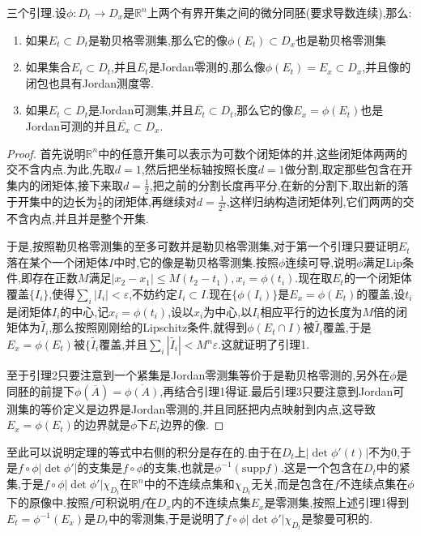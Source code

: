 三个引理.设$\phi:D_t\to D_x$是$\mathbb{R}^n$上两个有界开集之间的微分同胚(要求导数连续),那么:
\begin{enumerate}
	\item 如果$E_t\subset D_t$是勒贝格零测集,那么它的像$\phi(E_t)\subset D_x$也是勒贝格零测集
	\item 如果集合$E_t\subset D_t$,并且$\overline{E_t}$是Jordan零测的,那么像$\phi(E_t)=E_x\subset D_x$,并且像的闭包也具有Jordan测度零.
	\item 如果$E_t\subset D_t$是Jordan可测集,并且$\overline{E_t}\subset D_t$,那么它的像$E_x=\phi(E_t)$也是Jordan可测的并且$\overline{E_x}\subset D_x$.
\end{enumerate}
\begin{proof}
	
	首先说明$\mathbb{R}^n$中的任意开集可以表示为可数个闭矩体的并,这些闭矩体两两的交不含内点.为此,先取$d=1$,然后把坐标轴按照长度$d=1$做分割,取定那些包含在开集内的闭矩体,接下来取$d=\frac{1}{2}$,把之前的分割长度再平分,在新的分割下,取出新的落于开集中的边长为$\frac{1}{2}$的闭矩体,再继续对$d=\frac{1}{2^2}$,这样归纳构造闭矩体列,它们两两的交不含内点,并且并是整个开集.
	
	于是,按照勒贝格零测集的至多可数并是勒贝格零测集,对于第一个引理只要证明$E_t$落在某个一个闭矩体$I$中时,它的像是勒贝格零测集.按照$\phi$连续可导,说明$\phi$满足Lip条件,即存在正数$M$满足$|x_2-x_1|\le M(t_2-t_1),x_i=\phi(t_i)$.现在取$E_t$的一个闭矩体覆盖$\{I_i\}$,使得$\sum_{i}|I_i|<\varepsilon$,不妨约定$I_i\subset I$.现在$\{\phi(I_i)\}$是$E_x=\phi(E_t)$的覆盖,设$t_i$是闭矩体$I_i$的中心,记$x_i=\phi(t_i)$,设以$x_i$为中心,以$I_i$相应平行的边长度为$M$倍的闭矩体为$\widetilde{I_i}$,那么按照刚刚给的Lipschitz条件,就得到$\phi(E_t\cap I)$被$\widetilde{I_i}$覆盖,于是$E_x=\phi(E_t)$被$\{\widetilde{I_i}$覆盖,并且$\sum_{i}|\widetilde{I_i}|<M^n\varepsilon$.这就证明了引理1.
	
	至于引理2只要注意到一个紧集是Jordan零测集等价于是勒贝格零测的,另外在$\phi$是同胚的前提下$\phi(\overline{A})=\overline{\phi(A)}$,再结合引理1得证.最后引理3只要注意到Jordan可测集的等价定义是边界是Jordan零测的,并且同胚把内点映射到内点,这导致$E_x=\phi(E_t)$的边界就是$\phi$下$E_t$边界的像.
	
\end{proof}

至此可以说明定理的等式中右侧的积分是存在的.由于在$D_t$上$|\det\phi'(t)|$不为0,于是$f\circ\phi|\det\phi'|$的支集是$f\circ\phi$的支集,也就是$\phi^{-1}\left(\mathrm{supp}f\right)$.这是一个包含在$D_t$中的紧集,于是$f\circ\phi|\det\phi'|\chi_{D_t}$在$\mathbb{R}^n$中的不连续点集和$\chi_{D_t}$无关,而是包含在$f$不连续点集在$\phi$下的原像中.按照$f$可积说明$f$在$D_x$内的不连续点集$E_x$是零测集,按照上述引理1得到$E_t=\phi^{-1}(E_x)$是$D_t$中的零测集,于是说明了$f\circ\phi|\det\phi'|\chi_{D_t}$是黎曼可积的.

